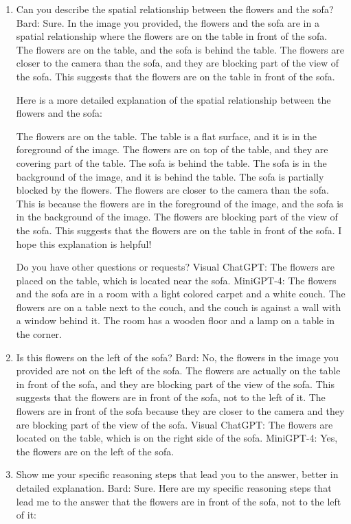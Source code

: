 \begin{enumerate}
    \item Can you describe the spatial relationship between the flowers and the sofa?
    \subitem Bard: 
    Sure. In the image you provided, the flowers and the sofa are in a spatial relationship where the flowers are on the table in front of the sofa. The flowers are on the table, and the sofa is behind the table. The flowers are closer to the camera than the sofa, and they are blocking part of the view of the sofa. This suggests that the flowers are on the table in front of the sofa.
    
    Here is a more detailed explanation of the spatial relationship between the flowers and the sofa:
    
    The flowers are on the table. The table is a flat surface, and it is in the foreground of the image. The flowers are on top of the table, and they are covering part of the table.
    The sofa is behind the table. The sofa is in the background of the image, and it is behind the table. The sofa is partially blocked by the flowers.
    The flowers are closer to the camera than the sofa. This is because the flowers are in the foreground of the image, and the sofa is in the background of the image.
    The flowers are blocking part of the view of the sofa. This suggests that the flowers are on the table in front of the sofa.
    I hope this explanation is helpful!
    
    Do you have other questions or requests?
    \subitem Visual ChatGPT: The flowers are placed on the table, which is located near the sofa.
    \subitem MiniGPT-4: The flowers and the sofa are in a room with a light colored carpet and a white couch. The flowers are on a table next to the couch, and the couch is against a wall with a window behind it. The room has a wooden floor and a lamp on a table in the corner.
    \item Is this flowers on the left of the sofa?
    \subitem Bard: 
    No, the flowers in the image you provided are not on the left of the sofa. The flowers are actually on the table in front of the sofa, and they are blocking part of the view of the sofa. This suggests that the flowers are in front of the sofa, not to the left of it. The flowers are in front of the sofa because they are closer to the camera and they are blocking part of the view of the sofa.
    \subitem Visual ChatGPT: The flowers are located on the table, which is on the right side of the sofa.
    \subitem MiniGPT-4: Yes, the flowers are on the left of the sofa.
    \item Show me your specific reasoning steps that lead you to the answer, better in detailed explanation.
    \subitem Bard: 
    Sure. Here are my specific reasoning steps that lead me to the answer that the flowers are in front of the sofa, not to the left of it:
    

\end{enumerate}
